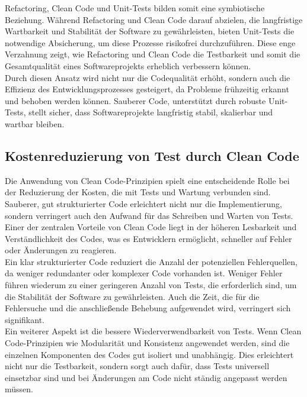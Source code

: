 \documentclass[conference]{IEEEtran}
\begin{document}
Refactoring, Clean Code und Unit-Tests bilden somit eine symbiotische Beziehung. Während Refactoring und Clean Code darauf abzielen, die langfristige Wartbarkeit und Stabilität der Software zu gewährleisten, bieten Unit-Tests die notwendige Absicherung, um diese Prozesse risikofrei durchzuführen. Diese enge Verzahnung zeigt, wie Refactoring und Clean Code die Testbarkeit und somit die Gesamtqualität eines Softwareprojekts erheblich verbessern können.\\

Durch diesen Ansatz wird nicht nur die Codequalität erhöht, sondern auch die Effizienz des Entwicklungsprozesses gesteigert, da Probleme frühzeitig erkannt und behoben werden können. Sauberer Code, unterstützt durch robuste Unit-Tests, stellt sicher, dass Softwareprojekte langfristig stabil, skalierbar und wartbar bleiben.

\subsection{Kostenreduzierung von Test durch Clean Code }
Die Anwendung von Clean Code-Prinzipien spielt eine entscheidende Rolle bei der Reduzierung der Kosten, die mit Tests und Wartung verbunden sind. Sauberer, gut strukturierter Code erleichtert nicht nur die Implementierung, sondern verringert auch den Aufwand für das Schreiben und Warten von Tests. Einer der zentralen Vorteile von Clean Code liegt in der höheren Lesbarkeit und Verständlichkeit des Codes, was es Entwicklern ermöglicht, schneller auf Fehler oder Änderungen zu reagieren.\\

Ein klar strukturierter Code reduziert die Anzahl der potenziellen Fehlerquellen, da weniger redundanter oder komplexer Code vorhanden ist. Weniger Fehler führen wiederum zu einer geringeren Anzahl von Tests, die erforderlich sind, um die Stabilität der Software zu gewährleisten. Auch die Zeit, die für die Fehlersuche und die anschließende Behebung aufgewendet wird, verringert sich signifikant.\\

Ein weiterer Aspekt ist die bessere Wiederverwendbarkeit von Tests. Wenn Clean Code-Prinzipien wie Modularität und Konsistenz angewendet werden, sind die einzelnen Komponenten des Codes gut isoliert und unabhängig. Dies erleichtert nicht nur die Testbarkeit, sondern sorgt auch dafür, dass Tests universell einsetzbar sind und bei Änderungen am Code nicht ständig angepasst werden müssen.\\
\end{document}
